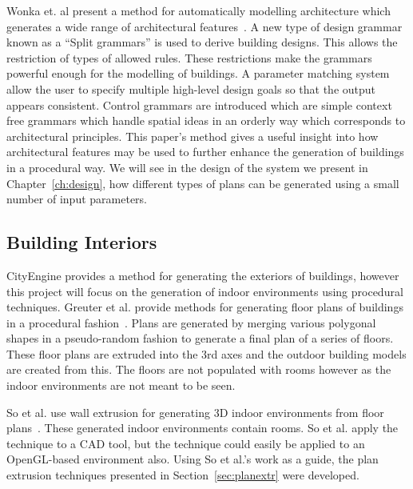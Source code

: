 Wonka et. al present a method for automatically modelling architecture which generates a wide range of architectural features~\cite{wonka2003instant}.
A new type of design grammar known as a ``Split grammars'' is used to derive building designs.
This allows the restriction of types of allowed rules. 
These restrictions make the grammars powerful enough for the modelling of buildings.
A parameter matching system allow the user to specify multiple high-level design goals so that the output appears consistent.
Control grammars are introduced which are simple context free grammars which handle spatial ideas in an orderly way which corresponds to architectural principles.
This paper's method gives a useful insight into how architectural features may be used to further enhance the generation of buildings in a procedural way.
We will see in the design of the system we present in Chapter~\ref{ch:design}, how different types of plans can be generated using a small number of input parameters.

\subsection{Building Interiors}
\label{sec:buildinginteriors}
CityEngine provides a method for generating the exteriors of buildings, however this project will focus on the generation of indoor environments using procedural techniques.
Greuter et al. provide methods for generating floor plans of buildings in a procedural fashion~\cite{greuter2003real}.
Plans are generated by merging various polygonal shapes in a pseudo-random fashion to generate a final plan of a series of floors.
These floor plans are extruded into the 3rd axes and the outdoor building models are created from this.
The floors are not populated with rooms however as the indoor environments are not meant to be seen.

So et al. use wall extrusion for generating 3D indoor environments from floor plans~\cite{so1998reconstruction}.
These generated indoor environments contain rooms.
So et al. apply the technique to a CAD tool, but the technique could easily be applied to an OpenGL-based environment also.
Using So et al.'s work as a guide, the plan extrusion techniques presented in Section~\ref{sec:planextr} were developed.

